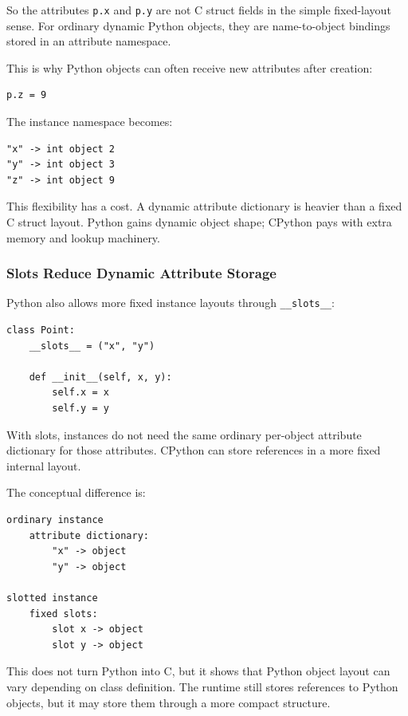 So the attributes \texttt{p.x} and \texttt{p.y} are not C struct fields in the simple fixed-layout sense. For ordinary dynamic Python objects, they are name-to-object bindings stored in an attribute namespace.

This is why Python objects can often receive new attributes after creation:

\begin{verbatim}
p.z = 9
\end{verbatim}

The instance namespace becomes:

\begin{verbatim}
"x" -> int object 2
"y" -> int object 3
"z" -> int object 9
\end{verbatim}

This flexibility has a cost. A dynamic attribute dictionary is heavier than a fixed C struct layout. Python gains dynamic object shape; CPython pays with extra memory and lookup machinery.

\subsubsection*{Slots Reduce Dynamic Attribute Storage}

Python also allows more fixed instance layouts through \texttt{\_\_slots\_\_}:

\begin{verbatim}
class Point:
    __slots__ = ("x", "y")

    def __init__(self, x, y):
        self.x = x
        self.y = y
\end{verbatim}

With slots, instances do not need the same ordinary per-object attribute dictionary for those attributes. CPython can store references in a more fixed internal layout.

The conceptual difference is:

\begin{verbatim}
ordinary instance
    attribute dictionary:
        "x" -> object
        "y" -> object

slotted instance
    fixed slots:
        slot x -> object
        slot y -> object
\end{verbatim}

This does not turn Python into C, but it shows that Python object layout can vary depending on class definition. The runtime still stores references to Python objects, but it may store them through a more compact structure.

